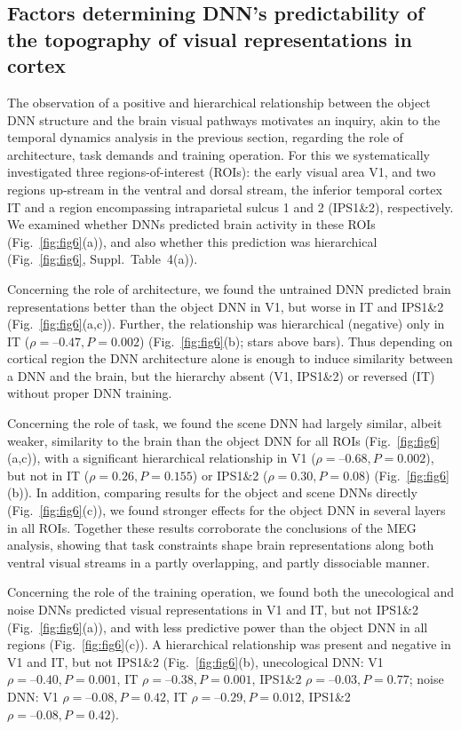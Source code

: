\documentclass[10pt,twocolumn,letterpaper]{article}
\begin{document}
\subsection{Factors determining DNN's predictability of the topography of visual representations in cortex}
The observation of a positive and hierarchical relationship between the object DNN structure and the brain visual pathways motivates an inquiry, akin to the temporal dynamics analysis in the previous section, regarding the role of architecture, task demands and training operation. For this we systematically investigated three regions-of-interest (ROIs): the early visual area V1, and two regions up-stream in the ventral and dorsal stream, the inferior temporal cortex IT and a region encompassing intraparietal sulcus 1 and 2 (IPS1\&2), respectively. We examined whether DNNs predicted brain activity in these ROIs (Fig.~\ref{fig:fig6}(a)), and also whether this prediction was hierarchical (Fig.~\ref{fig:fig6}, Suppl.~Table~4(a)).

Concerning the role of architecture, we found the untrained DNN predicted brain representations better than the object DNN in V1, but worse in IT and IPS1\&2 (Fig.~\ref{fig:fig6}(a,c)). Further, the relationship was hierarchical (negative) only in IT ($\rho = –0.47, P = 0.002$) (Fig.~\ref{fig:fig6}(b); stars above bars). Thus depending on cortical region the DNN architecture alone is enough to induce similarity between a DNN and the brain, but the hierarchy absent (V1, IPS1\&2) or reversed (IT) without proper DNN training.

Concerning the role of task, we found the scene DNN had largely similar, albeit weaker, similarity to the brain than the object DNN for all ROIs (Fig.~\ref{fig:fig6}(a,c)), with a significant hierarchical relationship in V1 ($\rho = –0.68, P = 0.002$), but not in IT ($\rho = 0.26, P = 0.155$) or IPS1\&2 ($\rho = 0.30, P = 0.08$) (Fig.~\ref{fig:fig6}(b)). In addition, comparing results for the object and scene DNNs directly (Fig.~\ref{fig:fig6}(c)), we found stronger effects for the object DNN in several layers in all ROIs. Together these results corroborate the conclusions of the MEG analysis, showing that task constraints shape brain representations along both ventral visual streams in a partly overlapping, and partly dissociable manner.

Concerning the role of the training operation, we found both the unecological and noise DNNs predicted visual representations in V1 and IT, but not IPS1\&2 (Fig.~\ref{fig:fig6}(a)), and with less predictive power than the object DNN in all regions (Fig.~\ref{fig:fig6}(c)). A hierarchical relationship was present and negative in V1 and IT, but not IPS1\&2 (Fig.~\ref{fig:fig6}(b), unecological DNN: V1 $\rho = –0.40, P = 0.001$, IT $\rho = –0.38, P = 0.001$, IPS1\&2 $\rho = –0.03, P = 0.77$; noise DNN: V1 $\rho= –0.08, P = 0.42$, IT $\rho = –0.29, P =0.012$, IPS1\&2 $\rho=–0.08, P = 0.42$).
\end{document}

